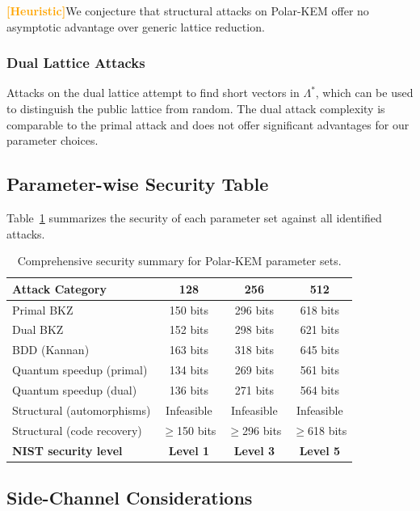 \documentclass[11pt,a4paper]{article}
\newcommand{\polarKem}{\textsf{Polar-KEM}\xspace}
\newcommand{\heuTag}{\textcolor{orange}{\textbf{[Heuristic]}}}
\begin{document}
\heuTag We conjecture that structural attacks on \polarKem offer no asymptotic advantage over generic lattice reduction.

\subsubsection{Dual Lattice Attacks}

Attacks on the dual lattice attempt to find short vectors in $\Lambda^*$, which can be used to distinguish the public lattice from random. The dual attack complexity is comparable to the primal attack and does not offer significant advantages for our parameter choices.

\subsection{Parameter-wise Security Table}\label{sec:param-security}

Table~\ref{tab:security-summary} summarizes the security of each parameter set against all identified attacks.

\begin{table}[H]
\centering
\caption{Comprehensive security summary for \polarKem parameter sets.}
\label{tab:security-summary}
\begin{tabular}{@{}lccc@{}}
\toprule
\textbf{Attack Category} & \textbf{128} & \textbf{256} & \textbf{512} \\
\midrule
Primal BKZ & 150 bits & 296 bits & 618 bits \\
Dual BKZ & 152 bits & 298 bits & 621 bits \\
BDD (Kannan) & 163 bits & 318 bits & 645 bits \\
Quantum speedup (primal) & 134 bits & 269 bits & 561 bits \\
Quantum speedup (dual) & 136 bits & 271 bits & 564 bits \\
\midrule
Structural (automorphisms) & Infeasible & Infeasible & Infeasible \\
Structural (code recovery) & $\geq$150 bits & $\geq$296 bits & $\geq$618 bits \\
\midrule
\textbf{NIST security level} & \textbf{Level 1} & \textbf{Level 3} & \textbf{Level 5} \\
\bottomrule
\end{tabular}
\end{table}

\subsection{Side-Channel Considerations}\label{sec:side-channel}
\end{document}

